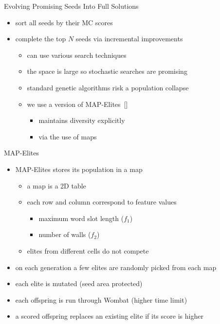 \documentclass[aspectratio=169,usenames,dvipsnames]{beamer}
\newcommand{\bei}{\begin{itemize}}
\newcommand{\eei}{\end{itemize}}
\newcommand{\ie}{\item}
\numberwithin{equation}{section}
\numberwithin{theorem}{section}
\numberwithin{lem}{section}
\numberwithin{df}{section}
\begin{document}

\begin{frame}{Evolving Promising Seeds Into Full Solutions}

\bei

\ie sort all seeds by their MC scores

\bigskip
\bigskip

\ie complete the top $N$ seeds via incremental improvements
\bei
\ie can use various search techniques
\ie the space is large so stochastic searches are promising
\ie standard genetic algorithms risk a population collapse
\ie we use a version of MAP-Elites~[\cite{mapElites}]
\bei
\ie maintains diversity explicitly
\ie via the use of maps
\eei
\eei

\eei


\end{frame}


\begin{frame}{MAP-Elites}

\bei

\ie MAP-Elites stores its population in a map
\bei
\ie a map is a 2D table
\ie each row and column correspond to feature values
\bei
\ie maximum word slot length ($f_1$)
\ie number of walls ($f_2$)
\eei
\ie elites from different cells do not compete
\eei
\ie on each generation a few elites are randomly picked from each map
\ie each elite is mutated (seed area protected)
\ie each offspring is run through {\sc Wombat} (higher time limit)
\ie a scored offspring replaces an existing elite if its score is higher
\eei

\end{frame}


\end{document}
